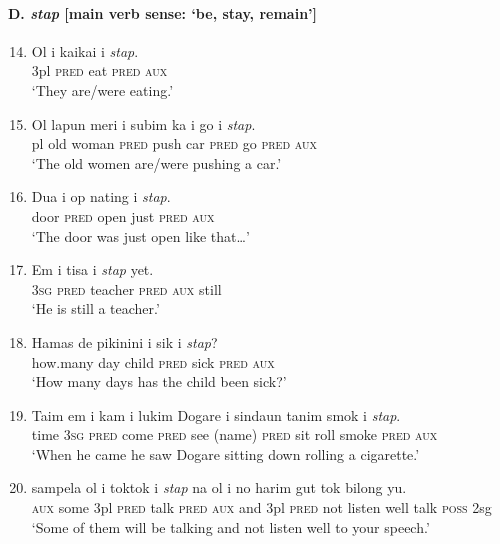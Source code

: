 {\paragraph*{D. \textit{stap}  [main verb sense: ‘be, stay, remain’]}
\begin{enumerate} \setcounter{enumi}{13} 
\item  
\gll Ol  i  kaikai  i \textit{stap}.\\
3pl  \textsc{pred}  eat  \textsc{pred}  \textsc{aux}\\
\glt ‘They are/were eating.’ 
\item   
\gll   Ol  lapun  meri  i  subim  ka  i  go  i \textit{stap}.\\
pl  old  woman  \textsc{pred}  push  car  \textsc{pred}  go  \textsc{pred}  \textsc{aux}\\
\glt ‘The old women are/were pushing a car.’  
\item   
\gll  Dua  i  op  nating  i \textit{stap}.\\
door  \textsc{pred}  open  just  \textsc{pred}  \textsc{aux}\\
\glt ‘The door was just open like that…’  
\item   
\gll Em  i tisa  i \textit{stap}  yet.\\
\textsc{3sg}  \textsc{pred} teacher  \textsc{pred}  \textsc{aux}  still\\
\glt ‘He is still a teacher.’  
\item   
\gll  Hamas  de  pikinini  i  sik  i \textit{stap}?\\
how.many  day  child  \textsc{pred}  sick  \textsc{pred}  \textsc{aux}\\
\glt ‘How many days has the child been sick?’  
\item   
\gll  Taim  em  i  kam  i lukim  Dogare  i  sindaun  tanim  smok  i  \textit{stap}.\\
time  \textsc{3sg}  \textsc{pred}  come  \textsc{pred}  see  (name)  \textsc{pred}  sit  roll  smoke  \textsc{pred}  \textsc{aux}\\
\glt ‘When he came he saw Dogare sitting down rolling a cigarette.’
\item 
{}  sampela  ol  i  toktok  i \textit{stap}  na  ol  i  no  harim  gut  tok  bilong  yu.\\
\textsc{aux}  some  3pl  \textsc{pred}  talk  \textsc{pred}  \textsc{aux}  and  3pl  \textsc{pred}  not  listen  well  talk  \textsc{poss}  2sg\\
\glt ‘Some of them will be talking and not listen well to your speech.’ 
\end{enumerate}

}
